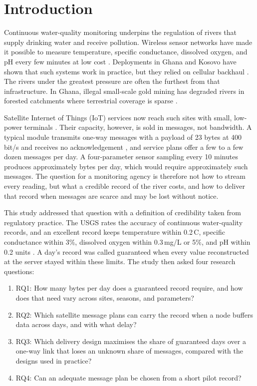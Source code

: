 \section{Introduction}
\label{sec:intro}

Continuous water-quality monitoring underpins the regulation of rivers that supply drinking water and receive pollution. Wireless sensor networks have made it possible to measure temperature, specific conductance, dissolved oxygen, and pH every few minutes at low cost \citep{adumanu2017}. Deployments in Ghana and Kosovo have shown that such systems work in practice, but they relied on cellular backhaul \citep{adumanu2020,ahmedi2022}. The rivers under the greatest pressure are often the furthest from that infrastructure. In Ghana, illegal small-scale gold mining has degraded rivers in forested catchments where terrestrial coverage is sparse \citep{duncan2020}.

Satellite Internet of Things (IoT) services now reach such sites with small, low-power terminals \citep{centenaro2021}. Their capacity, however, is sold in messages, not bandwidth. A typical module transmits one-way messages with a payload of 23 bytes at 400 bit/s and receives no acknowledgement \citep{kineis2023kim1}, and service plans offer a few to a few dozen messages per day. A four-parameter sensor sampling every 10 minutes produces approximately \rawBytes{} bytes per day, which would require approximately \rawMsgs{} such messages. The question for a monitoring agency is therefore not how to stream every reading, but what a credible record of the river costs, and how to deliver that record when messages are scarce and may be lost without notice.

This study addressed that question with a definition of credibility taken from regulatory practice. The USGS rates the accuracy of continuous water-quality records, and an excellent record keeps temperature within 0.2\,\textdegree C, specific conductance within 3\%, dissolved oxygen within 0.3\,mg/L or 5\%, and pH within 0.2 units \citep{wagner2006}. A day's record was called guaranteed when every value reconstructed at the server stayed within these limits. The study then asked four research questions:
\begin{enumerate}
  \item RQ1: How many bytes per day does a guaranteed record require, and how does that need vary across sites, seasons, and parameters?
  \item RQ2: Which satellite message plans can carry the record when a node buffers data across days, and with what delay?
  \item RQ3: Which delivery design maximises the share of guaranteed days over a one-way link that loses an unknown share of messages, compared with the designs used in practice?
  \item RQ4: Can an adequate message plan be chosen from a short pilot record?
\end{enumerate}

